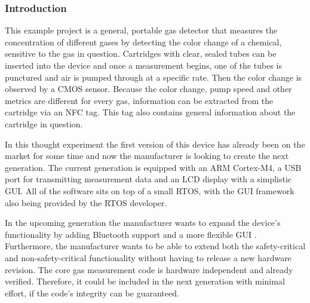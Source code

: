 \subsubsection{Introduction}
This example project is a general, portable gas detector that measures the concentration of different gases by detecting the color change of a chemical, sensitive to the gas in question. Cartridges with clear, sealed tubes can be inserted into the device and once a measurement begins, one of the tubes is punctured and air is pumped through at a specific rate. Then the color change is observed by a \gls{CMOS} sensor. Because the color change, pump speed and other metrics are different for every gas, information can be extracted from the cartridge via an \gls{NFC} tag. This tag also contains general information about the cartridge in question.

In this thought experiment the first version of this device has already been on the market for some time and now the manufacturer is looking to create the next generation. The current generation is equipped with an ARM Cortex-M4, a USB port for transmitting measurement data and an LCD display with a simplistic \gls{GUI}. All of the software sits on top of a small \gls{RTOS}, with the \gls{GUI} framework also being provided by the \gls{RTOS} developer.

In the upcoming generation the manufacturer wants to expand the device's functionality by adding Bluetooth support and a more flexible \gls{GUI} . Furthermore, the manufacturer wants to be able to extend both the safety-critical and non-safety-critical functionality without having to release a new hardware revision. The core gas measurement code is hardware independent and already verified. Therefore, it could be included in the next generation with minimal effort, if the code's integrity can be guaranteed.
